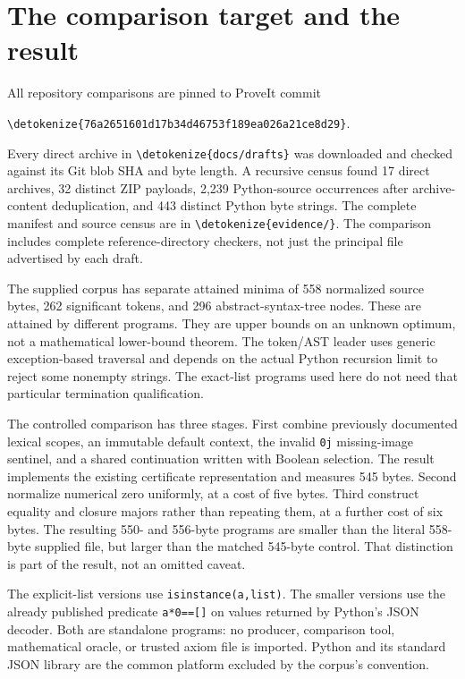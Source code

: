 \documentclass[11pt,letterpaper]{article}
\theoremstyle{definition}\newtheorem{definition}[theorem]{Definition}
\theoremstyle{remark}\newtheorem{remark}[theorem]{Remark}
\newcommand{\file}[1]{\expandafter\nolinkurl\expandafter{\detokenize{#1}}}
\begin{document}
\section{The comparison target and the result}
\label{sec:comparison}

All repository comparisons are pinned to ProveIt commit
\begin{center}\file{76a2651601d17b34d46753f189ea026a21ce8d29}.\end{center}
Every direct archive in \file{docs/drafts} was downloaded and checked
against its Git blob SHA and byte length. A recursive census found 17 direct
archives, 32 distinct ZIP payloads, 2,239 Python-source occurrences after
archive-content deduplication, and 443 distinct Python byte strings.
The complete manifest and source census are in \file{evidence/}.
The comparison includes complete reference-directory checkers, not just
the principal file advertised by each draft.\cite{snapshot,certified}

The supplied corpus has separate attained minima of 558 normalized source
bytes, 262 significant tokens, and 296 abstract-syntax-tree nodes. These
are attained by different programs. They are upper bounds on an unknown
optimum, not a mathematical lower-bound theorem. The token/AST leader
uses generic exception-based traversal and depends on the actual Python
recursion limit to reject some nonempty strings. The exact-list programs
used here do not need that particular termination qualification.



The controlled comparison has three stages. First combine previously
documented lexical scopes, an immutable default context, the invalid
\texttt{0j} missing-image sentinel, and a shared continuation written
with Boolean selection. The result implements the existing certificate
representation and measures 545 bytes. Second normalize numerical zero
uniformly, at a cost of five bytes. Third construct equality and closure
majors rather than repeating them, at a further cost of six bytes.
The resulting 550- and 556-byte programs are smaller than the literal
558-byte supplied file, but larger than the matched 545-byte control.
That distinction is part of the result, not an omitted caveat.

The explicit-list versions use \texttt{isinstance(a,list)}. The smaller
versions use the already published predicate \texttt{a*0==[]} on values
returned by Python's JSON decoder. Both are standalone programs: no
producer, comparison tool, mathematical oracle, or trusted axiom file is
imported. Python and its standard JSON library are the common platform
excluded by the corpus's convention.
\end{document}
